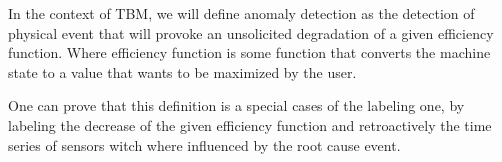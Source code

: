 \documentclass[../../main/main.tex]{subfiles}
\begin{document}
In the context of TBM, we will define anomaly detection as the detection
of physical event that will provoke an unsolicited  degradation of a given
efficiency function. Where efficiency function is some function that converts
the machine state to a value that wants to be maximized by the user.

One can prove that this definition is a special cases of the labeling one,
by labeling the decrease of the given efficiency function and retroactively
the time series of sensors witch where influenced by the root cause event.
\end{document}

